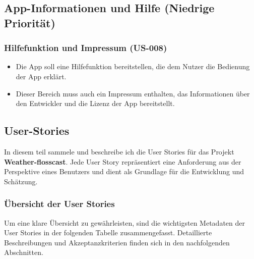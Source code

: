 \documentclass{article}
\begin{document}
\subsection{App-Informationen und Hilfe (Niedrige Priorität)}

\subsubsection{Hilfefunktion und Impressum (US-008)}
\begin{itemize}
    \item Die App soll eine Hilfefunktion bereitstellen, die dem Nutzer die Bedienung der App erklärt.
    \item Dieser Bereich muss auch ein Impressum enthalten, das Informationen über den Entwickler und die Lizenz der App bereitstellt.
\end{itemize}

\subsection{User-Stories}
In diesem teil sammele und beschreibe ich die User Stories für das Projekt \textbf{Weather-flosscast}. Jede User Story repräsentiert eine Anforderung aus der Perspektive eines Benutzers und dient als Grundlage für die Entwicklung und Schätzung.

\subsubsection{Übersicht der User Stories}
Um eine klare Übersicht zu gewährleisten, sind die wichtigsten Metadaten der User Stories in der folgenden Tabelle zusammengefasst. Detaillierte Beschreibungen und Akzeptanzkriterien finden sich in den nachfolgenden Abschnitten.

\setlength{\LTpre}{0pt} %
\setlength{\LTpost}{0pt} %
\end{document}
